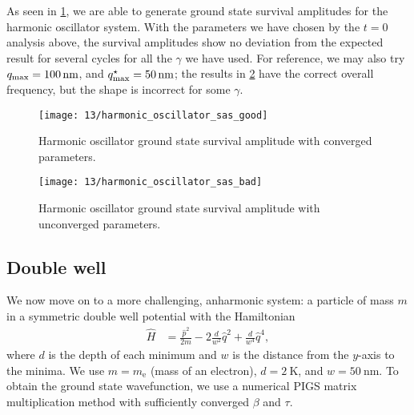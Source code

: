 As seen in \cref{fig:harmonic-oscillator-survival-good}, we are able to generate ground state survival amplitudes for the harmonic oscillator system.
With the parameters we have chosen by the $t = 0$ analysis above, the survival amplitudes show no deviation from the expected result for several cycles for all the $\gamma$ we have used.
For reference, we may also try $q_\mathrm{max} = \SI{100}{\nano\meter}$, and $q_\mathrm{max}^\star = \SI{50}{\nano\meter}$; the results in \cref{fig:harmonic-oscillator-survival-bad} have the correct overall frequency, but the shape is incorrect for some $\gamma$.

\begin{figure}
	\centering
	\texttt{[image: 13/harmonic\_oscillator\_sas\_good]}
	\caption[
		Harmonic oscillator survival amplitude with converged parameters
	]{
		Harmonic oscillator ground state survival amplitude with converged parameters.
		\explainplotsas{}
	}
	\label{fig:harmonic-oscillator-survival-good}
\end{figure}

\begin{figure}
	\centering
	\texttt{[image: 13/harmonic\_oscillator\_sas\_bad]}
	\caption[
		Harmonic oscillator survival amplitude with unconverged parameters
	]{
		Harmonic oscillator ground state survival amplitude with unconverged parameters.
		\explainplotsas{}
	}
	\label{fig:harmonic-oscillator-survival-bad}
\end{figure}


\subsection{Double well}

\label{sec:semiclassical-numerical-dw}

We now move on to a more challenging, anharmonic system: a particle of mass $m$ in a symmetric double well potential with the Hamiltonian
\begin{align}
	\hat{H}
	&= \frac{\hat{p}^2}{2 m} - 2 \frac{d}{w^2} \hat{q}^2 + \frac{d}{w^4} \hat{q}^4,
\end{align}
where $d$ is the depth of each minimum and $w$ is the distance from the $y$-axis to the minima.
We use $m = m_\mathrm{e}$ (mass of an electron), $d = \SI{2}{\kelvin}$, and $w = \SI{50}{\nano\meter}$.
To obtain the ground state wavefunction, we use a numerical PIGS matrix multiplication method with sufficiently converged $\beta$ and $\tau$.

